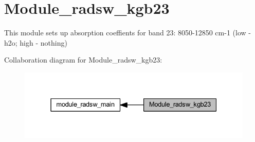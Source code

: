 \hypertarget{group__module__radsw__kgb23}{}\section{Module\+\_\+radsw\+\_\+kgb23}
\label{group__module__radsw__kgb23}


This module sets up absorption coeffients for band 23\+: 8050-\/12850 cm-\/1 (low -\/ h2o; high -\/ nothing)  


Collaboration diagram for Module\+\_\+radsw\+\_\+kgb23\+:\nopagebreak
\begin{figure}[H]
\begin{center}
\leavevmode
\includegraphics[width=331pt]{group__module__radsw__kgb23}
\end{center}
\end{figure}
